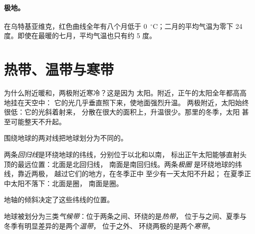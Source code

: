 \paragraph{极地。}在乌特基亚维克，红色曲线全年有八个月低于
0~$^\circ$C；二月的平均气温为零下
24 度。即使在最暖的七月，平均气温也只有约
5 度。

\section{热带、温带与寒带}

为什么附近暖和，两极附近寒冷？这是因为
太阳。附近，正午的太阳全年都高高地挂在天空中：
它的光几乎垂直照下来，使地面强烈升温。
两极附近，太阳始终很低：它的光斜着射来，
分散在很大的面积上，升温很少。那里的冬季，太阳
甚至可能整天不升起。

围绕地球的两对线把地球划分为不同的。

\begin{definition}[回归线与极圈]\label{def:g5:weather-and-climate:tropics}
两条\emph{回归线}是环绕地球的纬线，分别位于以北和以南，
标出正午太阳能够直射头顶的最远位置：北面是北回归线，
南面是南回归线。两条\emph{极圈}
是环绕地球的纬线，靠近两极，
越过它们的地方，在冬季正中
至少有一天太阳不升起；
在夏季正中太阳不落下：北面是圈，
南面是圈。
\end{definition}

地轴的倾斜决定了这些纬线的位置。

\begin{definition}[气候带]\label{def:g5:weather-and-climate:climate-zone}
地球被划分为三类\emph{气候带}：位于两条之间、环绕的是\emph{热带}，
位于与之间、夏季与冬季有明显差异的是两个\emph{温带}，
位于之外、
环绕两极的是两个\emph{寒带}。
\end{definition}

